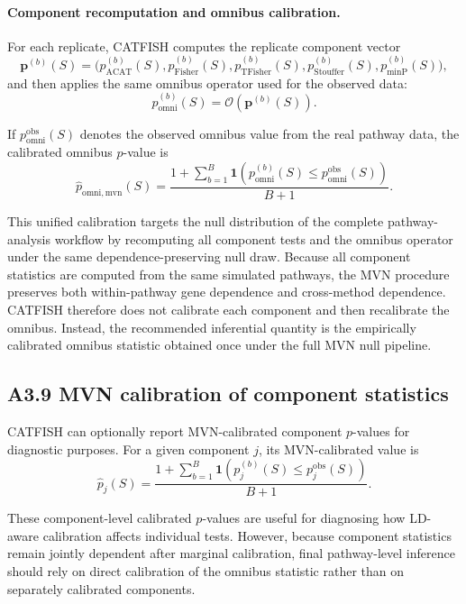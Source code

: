 \documentclass[unnumsec,webpdf,contemporary,large]{oup-authoring-template}%
\theoremstyle{thmstyleone}%
\theoremstyle{thmstyletwo}%
\theoremstyle{thmstylethree}%
\begin{document}
\begin{appendices}
\paragraph{Component recomputation and omnibus calibration.}
For each replicate, CATFISH computes the replicate component vector
\[
\mathbf{p}^{(b)}(S)
=
\Big(
p_{\mathrm{ACAT}}^{(b)}(S),
p_{\mathrm{Fisher}}^{(b)}(S),
p_{\mathrm{TFisher}}^{(b)}(S),
p_{\mathrm{Stouffer}}^{(b)}(S),
p_{\mathrm{minP}}^{(b)}(S)
\Big),
\]
and then applies the same omnibus operator used for the observed data:
\[
p_{\mathrm{omni}}^{(b)}(S)
=
\mathcal{O}\!\left(\mathbf{p}^{(b)}(S)\right).
\]

If $p_{\mathrm{omni}}^{\mathrm{obs}}(S)$ denotes the observed omnibus value from the real pathway data, the calibrated omnibus $p$-value is
\[
\hat p_{\mathrm{omni,mvn}}(S)
=
\frac{
1+\sum_{b=1}^{B}
\mathbf{1}\!\left(
p_{\mathrm{omni}}^{(b)}(S)
\le
p_{\mathrm{omni}}^{\mathrm{obs}}(S)
\right)
}{
B+1
}.
\]

This unified calibration targets the null distribution of the complete pathway-analysis workflow by recomputing all component tests and the omnibus operator under the same dependence-preserving null draw. Because all component statistics are computed from the same simulated pathways, the MVN procedure preserves both within-pathway gene dependence and cross-method dependence. CATFISH therefore does not calibrate each component and then recalibrate the omnibus. Instead, the recommended inferential quantity is the empirically calibrated omnibus statistic obtained once under the full MVN null pipeline.

\subsection{A3.9 MVN calibration of component statistics}

CATFISH can optionally report MVN-calibrated component $p$-values for diagnostic purposes. For a given component $j$, its MVN-calibrated value is
\[
\hat p_j(S)
=
\frac{
1+\sum_{b=1}^{B}
\mathbf{1}\!\left(
p_j^{(b)}(S)
\le
p_j^{\mathrm{obs}}(S)
\right)
}{
B+1
}.
\]

These component-level calibrated $p$-values are useful for diagnosing how LD-aware calibration affects individual tests. However, because component statistics remain jointly dependent after marginal calibration, final pathway-level inference should rely on direct calibration of the omnibus statistic rather than on separately calibrated components.


\end{appendices}
\end{document}
